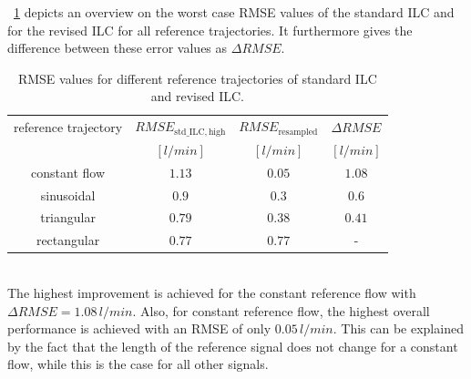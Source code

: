 \tablename~\ref{tab:compare_ILC} depicts an overview on the worst case RMSE values of the standard ILC and for the revised ILC for all reference trajectories. It furthermore gives the difference between these error values as $\Delta{RMSE}$.
\begin{table}[h]
  \centering
  \begin{tabular}{c|c|c|c}
    \toprule
     reference trajectory & $RMSE_{\mathrm{std\_ILC,high}}$ & $RMSE_{\mathrm{resampled}} $ & $\Delta{RMSE} $\\
     & $[l/min]$ & $[l/min]$ & $[l/min]$\\
    \midrule
    constant flow & $1.13$ & $0.05$ & $1.08$ \\
    sinusoidal & $0.9$ & $0.3$ & $0.6$ \\
    triangular & $0.79$ & $0.38$ & $0.41$ \\
    rectangular & $0.77$ & $0.77$ & - \\
    \bottomrule
\end{tabular}
  \caption[RMSE values for different reference trajectories of standard ILC and revised ILC]{RMSE values for different reference trajectories of standard ILC and revised ILC.}
  \label{tab:compare_ILC}
\end{table}
\\The highest improvement is achieved for the constant reference flow with $\Delta{RMSE}=1.08\,l/min$. Also, for constant reference flow, the highest overall performance is achieved with an RMSE of only $0.05\,l/min$. This can be explained by the fact that the length of the reference signal does not change for a constant flow, while this is the case for all other signals.
